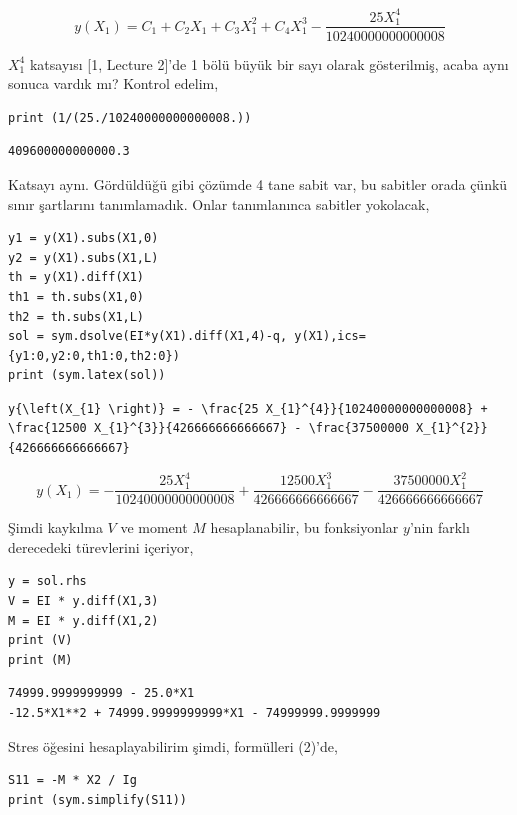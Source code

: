 \documentclass[12pt,fleqn]{article}\usepackage{../../common}
\begin{document}
$$
y{\left(X_{1} \right)} = C_{1} + C_{2} X_{1} + C_{3} X_{1}^{2} + C_{4} X_{1}^{3} - \frac{25 X_{1}^{4}}{10240000000000008}
$$

$X_1^4$ katsayısı [1, Lecture 2]'de 1 bölü büyük bir sayı olarak gösterilmiş,
acaba aynı sonuca vardık mı? Kontrol edelim,

\begin{verbatim}
print (1/(25./10240000000000008.))
\end{verbatim}

\begin{verbatim}
409600000000000.3
\end{verbatim}

Katsayı aynı. Gördüldüğü gibi çözümde 4 tane sabit var, bu sabitler orada çünkü
sınır şartlarını tanımlamadık. Onlar tanımlanınca sabitler yokolacak,

\begin{verbatim}
y1 = y(X1).subs(X1,0)
y2 = y(X1).subs(X1,L)
th = y(X1).diff(X1)
th1 = th.subs(X1,0)
th2 = th.subs(X1,L)
sol = sym.dsolve(EI*y(X1).diff(X1,4)-q, y(X1),ics={y1:0,y2:0,th1:0,th2:0})
print (sym.latex(sol))
\end{verbatim}

\begin{verbatim}
y{\left(X_{1} \right)} = - \frac{25 X_{1}^{4}}{10240000000000008} + \frac{12500 X_{1}^{3}}{426666666666667} - \frac{37500000 X_{1}^{2}}{426666666666667}
\end{verbatim}

$$
y{\left(X_{1} \right)} = - \frac{25 X_{1}^{4}}{10240000000000008} + \frac{12500 X_{1}^{3}}{426666666666667} - \frac{37500000 X_{1}^{2}}{426666666666667}
$$

Şimdi kaykılma $V$ ve moment $M$ hesaplanabilir, bu fonksiyonlar $y$'nin farklı
derecedeki türevlerini içeriyor, 

\begin{verbatim}
y = sol.rhs
V = EI * y.diff(X1,3)
M = EI * y.diff(X1,2)
print (V)
print (M)
\end{verbatim}

\begin{verbatim}
74999.9999999999 - 25.0*X1
-12.5*X1**2 + 74999.9999999999*X1 - 74999999.9999999
\end{verbatim}

Stres öğesini hesaplayabilirim şimdi, formülleri (2)'de,

\begin{verbatim}
S11 = -M * X2 / Ig
print (sym.simplify(S11))
\end{verbatim}
\end{document}
